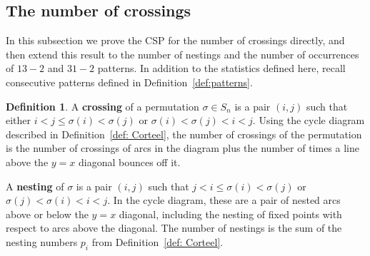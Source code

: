 \documentclass{amsart}
\theoremstyle{definition}
\newtheorem{definition}[thm]{Definition}
\begin{document}





%


\subsection{The number of crossings}\label{subsec: CorteelCSP}  In this subsection we prove the CSP for the number of crossings directly, and then extend this result to the number of nestings and the number of occurrences of $13-2$ and $31-2$ patterns.  
In addition to the statistics defined here, recall consecutive patterns defined in Definition~\ref{def:patterns}.
\begin{definition}\label{def:crossings_nestings}
  A \textbf{crossing} of a permutation $\sigma\in S_n$ is a pair $(i,j)$
  such that either $i<j\leq \sigma(i)< \sigma(j)$ or $\sigma(i)<\sigma(j)<i<j$.
  Using the cycle diagram described in Definition~\ref{def: Corteel}, the number of crossings of the permutation is the number of crossings of arcs in the diagram plus the number of times a line above the $y=x$ diagonal bounces off it.

  A \textbf{nesting} of $\sigma$ is a pair $(i,j)$ such that $j < i \leq  \sigma(i) < \sigma(j)$ or $\sigma(j) < \sigma(i) < i < j$. In the cycle diagram, these are a pair of nested arcs above or below the $y=x$ diagonal, including the nesting of fixed points with respect to arcs above the diagonal. The number of nestings is the sum of the nesting numbers $p_i$ from Definition~\ref{def: Corteel}.
\end{definition}
\end{document}
